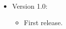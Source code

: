 \begin{itemize}
    \item Version 1.0:
        \begin{itemize}
            \item First release.
        \end{itemize}
\end{itemize}